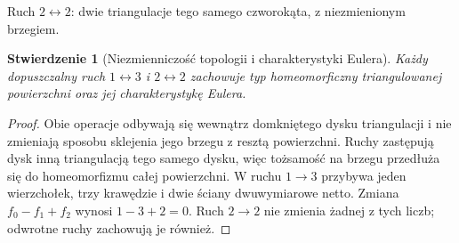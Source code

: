 \documentclass[11pt,a4paper]{report}
\numberwithin{equation}{section}
\theoremstyle{plain}
\newtheorem{stwierdzenie}[twierdzenie]{Stwierdzenie}
\theoremstyle{definition}
\theoremstyle{remark}
\begin{document}
\begin{samepage}
\begin{center}
\begin{minipage}{.96\linewidth}\centering
{}\par\smallskip

{\footnotesize Ruch $2\leftrightarrow2$: dwie triangulacje tego samego
czworokąta, z niezmienionym brzegiem.}
\end{minipage}
\end{center}
\end{samepage}

\begin{stwierdzenie}[Niezmienniczość topologii i charakterystyki Eulera]
Każdy dopuszczalny ruch $1\leftrightarrow3$ i
$2\leftrightarrow2$ zachowuje typ homeomorficzny
triangulowanej powierzchni oraz jej charakterystykę Eulera.
\end{stwierdzenie}

\begin{proof}
Obie operacje odbywają się wewnątrz domkniętego dysku
triangulacji i nie zmieniają sposobu sklejenia jego brzegu
z resztą powierzchni. Ruchy zastępują dysk inną
triangulacją tego samego dysku, więc tożsamość na brzegu
przedłuża się do homeomorfizmu całej powierzchni.
W ruchu $1\to3$ przybywa jeden wierzchołek, trzy krawędzie
i dwie ściany dwuwymiarowe netto. Zmiana $f_0-f_1+f_2$
wynosi $1-3+2=0$. Ruch $2\to2$ nie zmienia żadnej z tych
liczb; odwrotne ruchy zachowują je również.
\end{proof}
\end{document}
